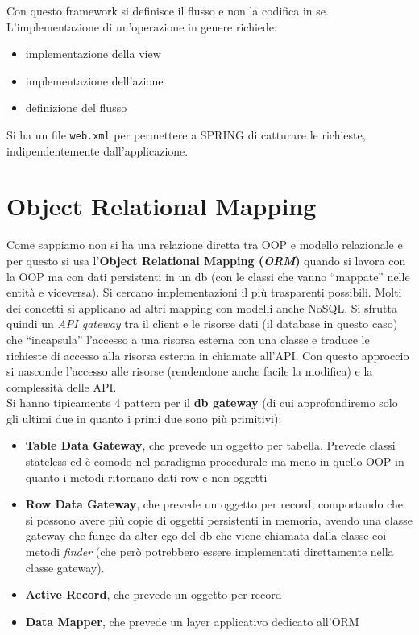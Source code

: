 \documentclass[a4paper,12pt, oneside]{book}
\begin{document}
Con questo framework si definisce il flusso e non la codifica in
se. L'implementazione di un'operazione in genere richiede:
\begin{itemize}
  \item implementazione della view
  \item implementazione dell'azione
  \item definizione del flusso
\end{itemize}
Si ha un file \texttt{web.xml} per permettere a SPRING di catturare le
richieste, indipendentemente dall'applicazione.
\section{Object Relational Mapping}
Come sappiamo non si ha una relazione diretta tra OOP e modello relazionale e
per questo si usa l'\textbf{Object Relational Mapping (\textit{ORM})} quando si
lavora con la OOP ma con dati persistenti in un db (con le classi che vanno
``mappate'' nelle entità e viceversa). Si cercano implementazioni il più
trasparenti possibili. Molti dei concetti si applicano ad altri mapping con
modelli anche NoSQL. Si sfrutta quindi un \textit{API gateway} tra il client e
le risorse dati (il database in questo caso) che
``incapsula'' l'accesso a una risorsa esterna con una classe e traduce le
richieste di accesso alla risorsa esterna in chiamate all'API. Con questo
approccio si nasconde l'accesso alle risorse (rendendone anche facile la
modifica) e la complessità delle API.\\
Si hanno tipicamente 4 pattern per il \textbf{db gateway} (di cui approfondiremo
solo gli ultimi due in quanto i primi due sono più primitivi):
\begin{itemize}
  \item \textbf{Table Data Gateway}, che prevede un oggetto per tabella. Prevede
  classi stateless ed è comodo nel paradigma procedurale ma meno in quello OOP
  in quanto i metodi ritornano dati row e non oggetti
  \item \textbf{Row Data Gateway}, che prevede un oggetto per record,
  comportando che si possono avere più copie di oggetti persistenti in
  memoria, avendo una classe gateway che funge da alter-ego del db che viene
  chiamata dalla classe coi metodi \textit{finder} (che però potrebbero essere
  implementati direttamente nella classe gateway). 
  \item \textbf{Active Record}, che prevede un oggetto per record
  \item \textbf{Data Mapper}, che prevede un layer applicativo dedicato all'ORM
\end{itemize}
\end{document}
